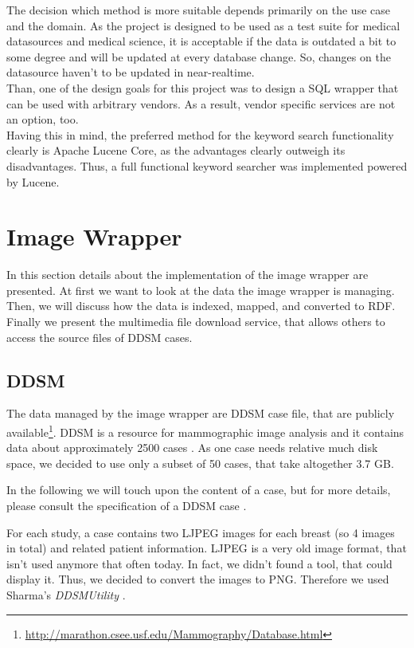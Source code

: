 The decision which method is more suitable depends primarily on the use case and the domain. As the project is designed to be used as a test suite for medical datasources and medical science, it is acceptable if the data is outdated a bit to some degree and will be updated at every database change. So, changes on the datasource haven't to be updated in near-realtime. \\
Than, one of the design goals for this project was to design a SQL wrapper that can be used with arbitrary vendors. As a result, vendor specific services are not an option, too.\\
Having this in mind, the preferred method for the keyword search functionality clearly is Apache Lucene Core, as the  advantages clearly outweigh its disadvantages. Thus, a full functional keyword searcher was implemented powered by Lucene.


\section{Image Wrapper}
 
In this section details about the implementation of the image wrapper are presented. 
At first we want to look at the data the image wrapper is managing. Then, we will discuss how the data is indexed, mapped, and converted to RDF. Finally we present the multimedia file download service, that allows others to access the source files of DDSM cases.

\subsection{DDSM}

The data managed by the image wrapper are DDSM case file, that are publicly available\footnote{\url{http://marathon.csee.usf.edu/Mammography/Database.html}}.
DDSM is a resource for mammographic image analysis and it contains data about approximately 2500 cases \cite{DDSM}. As one case needs relative much disk space, we decided to use only a subset of 50 cases, that take altogether 3.7 GB.

In the following we will touch upon the content of a case, but for more details, please consult the specification of a DDSM case \cite{DDSM_CASE_SPEC}. 

For each study, a case contains two LJPEG images for each breast (so 4 images in total) and related patient information. LJPEG is a very old image format, that isn't used anymore that often today. In fact, we didn't found a tool, that could display it. Thus, we decided to convert the images to PNG. Therefore we used Sharma's \emph{DDSMUtility} \cite{DDSM_UTILITY}.

